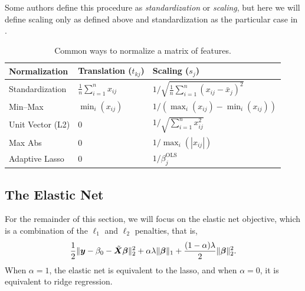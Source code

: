 Some authors define this procedure as \emph{standardization} or \emph{scaling}, but here we will define scaling only as defined above and standardization as the particular case in .

\begin{table}[hbt]
  \centering
  \caption{Common ways to normalize a matrix of features.}
  \label{tab:normalization-types}
  \begin{tabular}{lll}
    \toprule
    Normalization    & Translation (\(t_{kj}\))           & Scaling (\(s_j\))                                             \\
    \midrule
    Standardization  & \(\frac{1}{n}\sum_{i=1}^n x_{ij}\) & \(1 / \sqrt{\frac{1}{n}\sum_{i=1}^n (x_{ij} - \bar{x}_j)^2}\) \\
    \addlinespace
    Min--Max         & \(\min_i(x_{ij})\)                 & \(1 / \left(\max_i(x_{ij}) - \min_i(x_{ij})\right)\)          \\
    \addlinespace
    Unit Vector (L2) & 0                                  & \(1 / \sqrt{\sum_{i=1}^n x_{ij}^2}\)                          \\
    \addlinespace
    Max Abs          & 0                                  & \(1 / \max_i(|x_{ij}|)\)                                      \\
    \addlinespace
    Adaptive Lasso   & 0                                  & \(1 / \beta_j^\text{OLS}\)                                    \\
    \bottomrule
  \end{tabular}
\end{table}

\subsection{The Elastic Net}

For the remainder of this section, we will focus on the elastic net objective, which is a combination of the \(\ell_1\) and \(\ell_2\) penalties, that is,
\begin{equation}
  \label{eq:elastic-net}
  \frac{1}{2} \lVert \vec y - \beta_0 - \tilde{\mat{X}}\vec{\beta} \rVert^2_2  + \alpha\lambda \lVert \vec\beta \rVert_1 + \frac{(1 - \alpha)\lambda}{2}\lVert \vec \beta \rVert_2^2.
\end{equation}
When \(\alpha = 1\), the elastic net is equivalent to the lasso, and when \(\alpha = 0\), it is equivalent to ridge regression.

